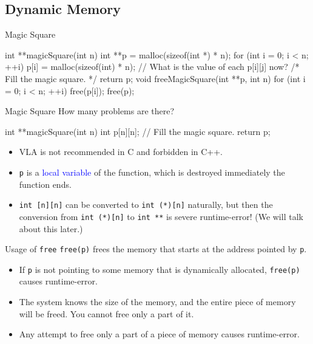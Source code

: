 \documentclass[handout]{beamer}
\newcommand{\blue}[1]{\textcolor{blue}{#1}}
\newcommand{\ttt}[1]{\texttt{#1}}
\theoremstyle{definition}
\begin{document}
\subsection{Dynamic Memory}

\begin{frame}[fragile]{Magic Square}
    \begin{cpp}
int **magicSquare(int n) {
  int **p = malloc(sizeof(int *) * n);
  for (int i = 0; i < n; ++i)
    p[i] = malloc(sizeof(int) * n);
  // What is the value of each p[i][j] now?
  /* Fill the magic square. */
  return p;
}
void freeMagicSquare(int **p, int n) {
  for (int i = 0; i < n; ++i)
    free(p[i]);
  free(p);
}
    \end{cpp}
\end{frame}

\begin{frame}[fragile]{Magic Square}
    How many problems are there?
    \begin{cpp}
int **magicSquare(int n) {
  int p[n][n];
  // Fill the magic square.
  return p;
}
    \end{cpp}
    \pause
    \begin{itemize}
        \item VLA is not recommended in C and forbidden in C++.
        \item \ttt{p} is a \blue{local variable} of the function, which is destroyed immediately the function ends.
        \item \ttt{int [n][n]} can be converted to \ttt{int (*)[n]} naturally, but then the conversion from \ttt{int (*)[n]} to \ttt{int **} is severe runtime-error! (We will talk about this later.)
    \end{itemize}
\end{frame}

\begin{frame}[fragile]{Usage of \ttt{free}}
    \ttt{free(p)} frees the memory that starts at the address pointed by \ttt{p}.
    \begin{itemize}
        \item If \ttt{p} is not pointing to some memory that is dynamically allocated, \ttt{free(p)} causes runtime-error.
        \item The system knows the size of the memory, and the entire piece of memory will be freed. You cannot free only a part of it.
        \item Any attempt to free only a part of a piece of memory causes runtime-error.
    \end{itemize}
\end{frame}
\end{document}
